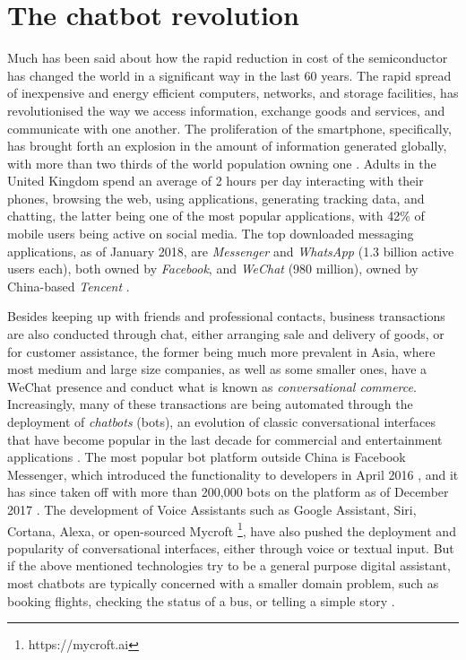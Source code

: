 \section{The chatbot revolution}
Much has been said about how the rapid reduction in cost of the semiconductor has changed the world in a significant way in the last 60 years. The rapid spread of inexpensive and energy efficient computers, networks, and storage facilities, has revolutionised the way we access information, exchange goods and services, and communicate with one another. The proliferation of the smartphone, specifically, has brought forth an explosion in the amount of information generated globally, with more than two thirds of the world population owning one \cite{wearesocial}. Adults in the United Kingdom spend an average of 2 hours per day interacting with their phones, browsing the web, using applications, generating tracking data, and chatting, the latter being one of the most popular applications, with 42\% of mobile users \cite{mobilesocial} being active on social media. The top downloaded messaging applications, as of January 2018, are \textit{Messenger} and \textit{WhatsApp} (1.3 billion active users each), both owned by \textit{Facebook}, and \textit{WeChat} (980 million), owned by China-based \textit{Tencent} \cite{mobilestatista}.

Besides keeping up with friends and professional contacts, business transactions are also conducted through chat, either arranging sale and delivery of goods, or for customer assistance, the former being much more prevalent in Asia, where most medium and large size companies, as well as some smaller ones, have a WeChat presence and conduct what is known as \textit{conversational commerce}. Increasingly, many of these transactions are being automated through the deployment of \textit{chatbots} (bots), an evolution of classic conversational interfaces that have become popular in the last decade for commercial and entertainment applications \cite{Dale2016}. The most popular bot platform outside China is Facebook Messenger, which introduced the functionality to developers in April 2016 \cite{Messenger2016}, and it has since taken off with more than 200,000 bots on the platform as of December 2017 \cite{Messenger2017}. The development of Voice Assistants such as Google Assistant, Siri, Cortana, Alexa, or open-sourced Mycroft \footnote{https://mycroft.ai}, have also pushed the deployment and popularity of conversational interfaces, either through voice or textual input. But if the above mentioned technologies try to be a general purpose digital assistant, most chatbots are typically concerned with a smaller domain problem, such as booking flights, checking the status of a bus, or telling a simple story \cite{meisel}.

